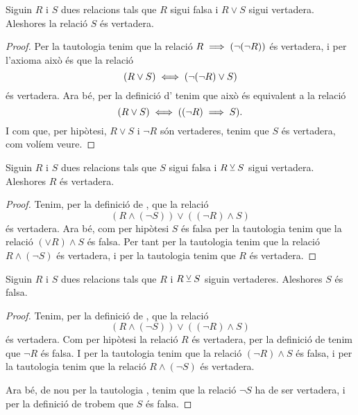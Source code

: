\documentclass[../../Main.tex]{subfiles}
\begin{document}
	\begin{tautology}
		\label{taut:condicions per disjunció}
		Siguin \(R\) i \(S\) dues relacions tals que \(R\) sigui falsa i \(R\lor S\) sigui vertadera. Aleshores la relació \(S\) és vertadera.
		\begin{proof}
			Per la tautologia  tenim que la relació \(R\implies(\lnot(\lnot R))\) és vertadera, i per l'axioma  això és que la relació
			\[(R\lor S)\iff(\lnot(\lnot R)\lor S)\]
			és vertadera. Ara bé, per la definició d' tenim que això és equivalent a la relació
			\[(R\lor S)\iff((\lnot R)\implies S).\]
			I com que, per hipòtesi, \(R\lor S\) i \(\lnot R\) són vertaderes, tenim que \(S\) és vertadera, com volíem veure.
		\end{proof}
	\end{tautology}
	\begin{tautology}
		\label{taut:disjunció excloent 1}
		Siguin \(R\) i \(S\) dues relacions tals que \(S\) sigui falsa i \(R\mathbin{\veebar} S\) sigui vertadera. Aleshores \(R\) és vertadera.
		\begin{proof}
			Tenim, per la definició de , que la relació
			\[(R\land(\lnot S))\lor((\lnot R)\land S)\]
			és vertadera. Ara bé, com per hipòtesi \(S\) és falsa per la tautologia  tenim que la relació \((\lor R)\land S\) és falsa. Per tant per la tautologia  tenim que la relació \(R\land(\lnot S)\) és vertadera, i per la tautologia  tenim que \(R\) és vertadera.
		\end{proof}
	\end{tautology}
	\begin{tautology}
		\label{taut:disjunció excloent 2}
		Siguin \(R\) i \(S\) dues relacions tals que \(R\) i \(R\mathbin{\veebar} S\) siguin vertaderes. Aleshores \(S\) és falsa.
		\begin{proof}
			Tenim, per la definició de , que la relació
			\[(R\land(\lnot S))\lor((\lnot R)\land S)\]
			és vertadera. Com per hipòtesi la relació \(R\) és vertadera, per la definició de  tenim que \(\lnot R\) és falsa. I per la tautologia  tenim que la relació \((\lnot R)\land S\) és falsa, i per la tautologia  tenim que la relació \(R\land(\lnot S)\) és vertadera.
			
			Ara bé, de nou per la tautologia , tenim que la relació \(\lnot S\) ha de ser vertadera, i per la definició de  trobem que \(S\) és falsa.
		\end{proof}
	\end{tautology}
\end{document}
